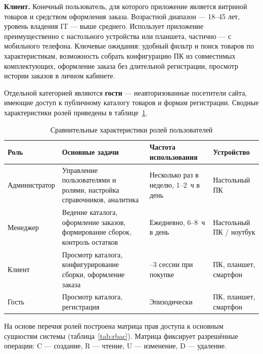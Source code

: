 \documentclass[14pt, a4paper]{extarticle}
\begin{document}
\textbf{Клиент.} Конечный пользователь, для которого приложение является витриной товаров и средством оформления заказа. Возрастной диапазон --- 18--45 лет, уровень владения IT --- выше среднего. Использует приложение преимущественно с настольного устройства или планшета, частично --- с мобильного телефона. Ключевые ожидания: удобный фильтр и поиск товаров по характеристикам, возможность собрать конфигурацию ПК из совместимых комплектующих, оформление заказа без длительной регистрации, просмотр истории заказов в личном кабинете.

Отдельной категорией являются \textbf{гости} --- неавторизованные посетители сайта, имеющие доступ к публичному каталогу товаров и формам регистрации. Сводные характеристики ролей приведены в таблице~\ref{tab:roles}.

\begin{table}[ht!]
\caption{Сравнительные характеристики ролей пользователей}
\label{tab:roles}
\small
\begin{tabularx}{\textwidth}{|>{\RaggedRight\arraybackslash}p{}|>{\RaggedRight\arraybackslash}X|>{\RaggedRight\arraybackslash}p{}|>{\RaggedRight\arraybackslash}p{}|}
\hline
\textbf{Роль} & \textbf{Основные задачи} & \textbf{Частота использования} & \textbf{Устройство} \\ \hline
Администратор & Управление пользователями и ролями, настройка справочников, аналитика & Несколько раз в неделю, 1--2~ч в день & Настольный ПК \\ \hline
Менеджер & Ведение каталога, оформление заказов, формирование сборок, контроль остатков & Ежедневно, 6--8~ч в день & Настольный ПК / ноутбук \\ \hline
Клиент & Просмотр каталога, конфигурирование сборки, оформление заказа & 1--3 сессии при покупке & ПК, планшет, смартфон \\ \hline
Гость & Просмотр каталога, регистрация & Эпизодически & ПК, планшет, смартфон \\ \hline
\end{tabularx}
\end{table}

На основе перечня ролей построена матрица прав доступа к основным сущностям системы (таблица~\ref{tab:rbac}). Матрица фиксирует разрешённые операции: C --- создание, R --- чтение, U --- изменение, D --- удаление.
\end{document}

